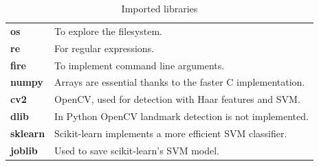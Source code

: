 \begin{table}[h!t]
    \centering
    \caption{Imported libraries}
    \label{tab:libraries}
    \begin{tabular}{ll}
        \textbf{os} & To explore the filesystem. \\
        \textbf{re} & For regular expressions. \\
        \textbf{fire} & To implement command line arguments. \\
        \textbf{numpy} & Arrays are essential thanks to the faster C implementation. \\
        \textbf{cv2} & OpenCV, used for detection with Haar features and SVM. \\
        \textbf{dlib} & In Python OpenCV landmark detection is not implemented. \\
        \textbf{sklearn} & Scikit-learn implements a more efficient SVM classifier. \\
        \textbf{joblib} & Used to save scikit-learn's SVM model. \\
    \end{tabular}
\end{table}
